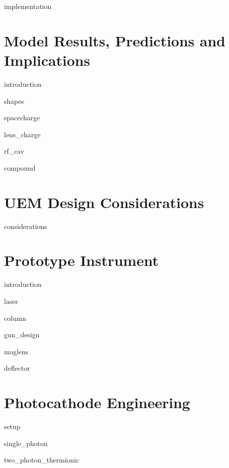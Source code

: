 \documentclass{uicthesi}
\begin{document}
  {implementation}

\chapter{Model Results, Predictions and Implications} \label{chap:model_results}

  {introduction}

  {shapes}

  {spacecharge}

  {lens_charge}

  {rf_cav}

  {compound}

\chapter{UEM Design Considerations} \label{chap:considerations}

  {considerations}

\chapter{Prototype Instrument} \label{chap:prototype}

  {introduction}

  {laser}

  {column}

  {gun_design}

  {maglens}

  {deflector}

\chapter{Photocathode Engineering} \label{chap:photocathode}

  {setup}

  {single_photon}

  {two_photon_thermionic}
\end{document}
